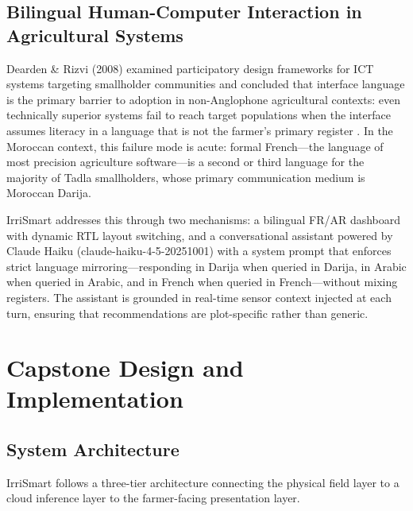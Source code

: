 \documentclass[12pt,a4paper]{report}
\begin{document}
\section{Bilingual Human-Computer Interaction in Agricultural Systems}

Dearden \& Rizvi (2008) examined participatory design frameworks for ICT systems targeting smallholder communities and concluded that interface language is the primary barrier to adoption in non-Anglophone agricultural contexts: even technically superior systems fail to reach target populations when the interface assumes literacy in a language that is not the farmer's primary register \cite{dearden2008}. In the Moroccan context, this failure mode is acute: formal French---the language of most precision agriculture software---is a second or third language for the majority of Tadla smallholders, whose primary communication medium is Moroccan Darija.

IrriSmart addresses this through two mechanisms: a bilingual FR/AR dashboard with dynamic RTL layout switching, and a conversational assistant powered by Claude Haiku (claude-haiku-4-5-20251001) with a system prompt that enforces strict language mirroring---responding in Darija when queried in Darija, in Arabic when queried in Arabic, and in French when queried in French---without mixing registers. The assistant is grounded in real-time sensor context injected at each turn, ensuring that recommendations are plot-specific rather than generic.

\chapter{Capstone Design and Implementation}

\section{System Architecture}

IrriSmart follows a three-tier architecture connecting the physical field layer to a cloud inference layer to the farmer-facing presentation layer.
\end{document}
